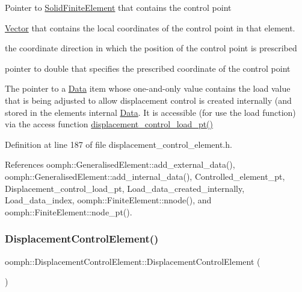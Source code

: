 \begin{DoxyItemize}
\item Pointer to {\ttfamily \hyperlink{classoomph_1_1SolidFiniteElement}{Solid\+Finite\+Element}} that contains the control point
\item \hyperlink{classoomph_1_1Vector}{Vector} that contains the local coordinates of the control point in that element.
\item the coordinate direction in which the position of the control point is prescribed
\item pointer to double that specifies the prescribed coordinate of the control point
\end{DoxyItemize}The pointer to a \hyperlink{classoomph_1_1Data}{Data} item whose one-\/and-\/only value contains the load value that is being adjusted to allow displacement control is created internally (and stored in the element\textquotesingle{}s internal {\ttfamily \hyperlink{classoomph_1_1Data}{Data}}. It is accessible (for use the load function) via the access function {\ttfamily \hyperlink{classoomph_1_1DisplacementControlElement_a4bb140bfc80d122542ad52fd0074171f}{displacement\+\_\+control\+\_\+load\+\_\+pt()}} 

Definition at line 187 of file displacement\+\_\+control\+\_\+element.\+h.



References oomph\+::\+Generalised\+Element\+::add\+\_\+external\+\_\+data(), oomph\+::\+Generalised\+Element\+::add\+\_\+internal\+\_\+data(), Controlled\+\_\+element\+\_\+pt, Displacement\+\_\+control\+\_\+load\+\_\+pt, Load\+\_\+data\+\_\+created\+\_\+internally, Load\+\_\+data\+\_\+index, oomph\+::\+Finite\+Element\+::nnode(), and oomph\+::\+Finite\+Element\+::node\+\_\+pt().

\mbox{\label{classoomph_1_1DisplacementControlElement_afb18e9ef67f0c7f33eaec32553e5d5ee}} 
\subsubsection{\texorpdfstring{Displacement\+Control\+Element()}{DisplacementControlElement()}\hspace{0.1cm}{\footnotesize\ttfamily [3/3]}}
{\footnotesize\ttfamily oomph\+::\+Displacement\+Control\+Element\+::\+Displacement\+Control\+Element (\begin{DoxyParamCaption}\item[{const \hyperlink{classoomph_1_1DisplacementControlElement}{Displacement\+Control\+Element} \&}]{ }\end{DoxyParamCaption})\hspace{0.3cm}{\ttfamily [inline]}}



